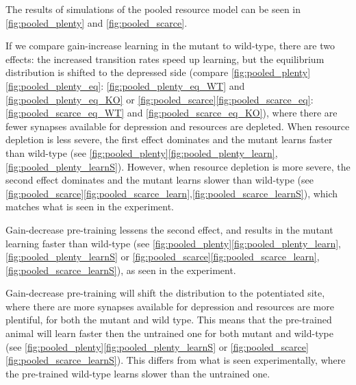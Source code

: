 \documentclass[12pt]{article}
\begin{document}
The results of simulations of the pooled resource model can be seen in \autoref{fig:pooled_plenty} and \autoref{fig:pooled_scarce}. 

If we compare gain-increase learning in the mutant to wild-type, there are two effects: the increased transition rates speed up learning, but the equilibrium distribution is shifted to the depressed side (compare \autoref{fig:pooled_plenty}\ref{fig:pooled_plenty_eq}: \ref{fig:pooled_plenty_eq_WT} and \ref{fig:pooled_plenty_eq_KO} or \autoref{fig:pooled_scarce}\ref{fig:pooled_scarce_eq}: \ref{fig:pooled_scarce_eq_WT} and \ref{fig:pooled_scarce_eq_KO}), where there are fewer synapses available for depression and resources are depleted.
When resource depletion is less severe, the first effect dominates and the mutant learns faster than wild-type (see \autoref{fig:pooled_plenty}\ref{fig:pooled_plenty_learn},\ref{fig:pooled_plenty_learnS}).
However, when resource depletion is more severe, the second effect dominates and the mutant learns slower than wild-type (see \autoref{fig:pooled_scarce}\ref{fig:pooled_scarce_learn},\ref{fig:pooled_scarce_learnS}), which matches what is seen in the experiment.

Gain-decrease pre-training lessens the second effect, and results in the mutant learning faster than wild-type (see \autoref{fig:pooled_plenty}\ref{fig:pooled_plenty_learn},\ref{fig:pooled_plenty_learnS} or \autoref{fig:pooled_scarce}\ref{fig:pooled_scarce_learn},\ref{fig:pooled_scarce_learnS}), as seen in the experiment. 

Gain-decrease pre-training will shift the distribution to the potentiated site, where there are more synapses available for depression and resources are more plentiful, for both the mutant and wild type.
This means that the pre-trained animal will learn faster then the untrained one for both mutant and wild-type (see \autoref{fig:pooled_plenty}\ref{fig:pooled_plenty_learnS} or \autoref{fig:pooled_scarce}\ref{fig:pooled_scarce_learnS}).
This differs from what is seen experimentally, where the pre-trained wild-type learns slower than the untrained one.















\end{document}
